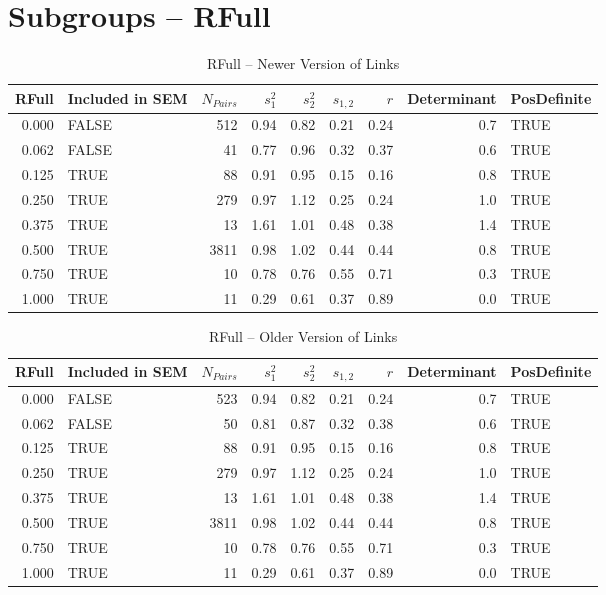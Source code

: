 \documentclass{article}\usepackage[]{graphicx}\usepackage[]{color}
\begin{document}
\section{Subgroups --  RFull }%
\begin{table}[ht]
\centering
\begin{tabular}{rlrrrrrrl}
  \hline
RFull & Included in SEM & $N_{Pairs}$ & $s_1^2$ & $s_2^2$ & $s_{1,2}$ & $r$ & Determinant & PosDefinite \\ 
  \hline
0.000 & FALSE & 512 & 0.94 & 0.82 & 0.21 & 0.24 & 0.7 & TRUE \\ 
  0.062 & FALSE & 41 & 0.77 & 0.96 & 0.32 & 0.37 & 0.6 & TRUE \\ 
  0.125 & TRUE & 88 & 0.91 & 0.95 & 0.15 & 0.16 & 0.8 & TRUE \\ 
  0.250 & TRUE & 279 & 0.97 & 1.12 & 0.25 & 0.24 & 1.0 & TRUE \\ 
  0.375 & TRUE & 13 & 1.61 & 1.01 & 0.48 & 0.38 & 1.4 & TRUE \\ 
  0.500 & TRUE & 3811 & 0.98 & 1.02 & 0.44 & 0.44 & 0.8 & TRUE \\ 
  0.750 & TRUE & 10 & 0.78 & 0.76 & 0.55 & 0.71 & 0.3 & TRUE \\ 
  1.000 & TRUE & 11 & 0.29 & 0.61 & 0.37 & 0.89 & 0.0 & TRUE \\ 
   \hline
\end{tabular}
\caption{RFull -- Newer Version of Links} 
\end{table}
\begin{table}[ht]
\centering
\begin{tabular}{rlrrrrrrl}
  \hline
RFull & Included in SEM & $N_{Pairs}$ & $s_1^2$ & $s_2^2$ & $s_{1,2}$ & $r$ & Determinant & PosDefinite \\ 
  \hline
0.000 & FALSE & 523 & 0.94 & 0.82 & 0.21 & 0.24 & 0.7 & TRUE \\ 
  0.062 & FALSE & 50 & 0.81 & 0.87 & 0.32 & 0.38 & 0.6 & TRUE \\ 
  0.125 & TRUE & 88 & 0.91 & 0.95 & 0.15 & 0.16 & 0.8 & TRUE \\ 
  0.250 & TRUE & 279 & 0.97 & 1.12 & 0.25 & 0.24 & 1.0 & TRUE \\ 
  0.375 & TRUE & 13 & 1.61 & 1.01 & 0.48 & 0.38 & 1.4 & TRUE \\ 
  0.500 & TRUE & 3811 & 0.98 & 1.02 & 0.44 & 0.44 & 0.8 & TRUE \\ 
  0.750 & TRUE & 10 & 0.78 & 0.76 & 0.55 & 0.71 & 0.3 & TRUE \\ 
  1.000 & TRUE & 11 & 0.29 & 0.61 & 0.37 & 0.89 & 0.0 & TRUE \\ 
   \hline
\end{tabular}
\caption{RFull -- Older Version of Links} 
\end{table}
\end{document}

